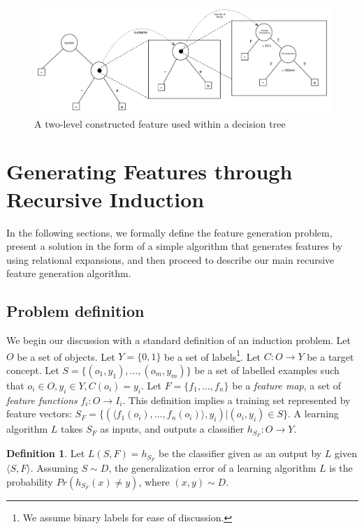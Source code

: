 \documentclass[twoside,11pt]{article}
\theoremstyle{definition}
\newtheorem{defn}{Definition}[section]
\begin{document}
\begin{figure}[th]
	\centering
	\includegraphics[width=\linewidth]{fig3.pdf}
	\caption{A two-level constructed feature used within a decision tree}
	\label{fig:lvl2_tree}
\end{figure}



\section{Generating Features through Recursive Induction} \label{formal}

In the following sections, we formally define the feature generation problem, present a solution  in the form of a simple algorithm that generates features by using
relational expansions, and then proceed to describe our main recursive feature generation algorithm.

\subsection{Problem definition}

We begin our discussion with a standard definition of an induction problem. 
Let $O$ be a set of objects. Let $Y=\{0,1\}$ be a set of labels\footnote{We assume binary labels for ease of discussion.}. Let $C:O\rightarrow Y$ be a target concept. Let $S=\{(o_{1},y_{1}),\ldots,(o_{m},y_{m})\}$ be a set of labelled examples such that $o_{i}\in O, y_{i}\in Y, C(o_i)=y_i$. 
Let $F=\{f_{1},\ldots,f_{n}\}$ be a \emph{feature map}, a set of \emph{feature functions} $f_{i}:O\rightarrow I_{i}$.  This definition implies a training set represented by feature vectors: $S_F=\{ (\langle f_1(o_i),\ldots,f_n(o_i)\rangle, y_i) | (o_i,y_i) \in S\}$. A learning algorithm $L$ takes $S_F$ as inputs, and outputs a classifier $h_{S_F}:O\rightarrow Y$.
\begin{defn}
	Let $L(S,F)=h_{S_F}$ be the classifier given as an output by $L$ given $\langle S,F\rangle$. Assuming $S\sim D$, the generalization error of a learning algorithm $L$ is the probability $Pr(h_{S_F}(x)\neq y)$, where $(x,y)\sim D$.
\end{defn}
\end{document}
